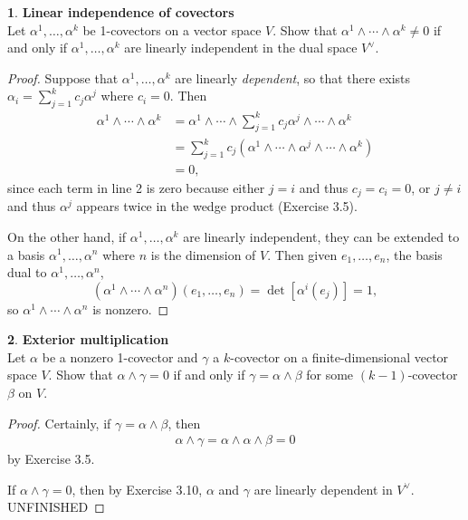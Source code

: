 \documentclass[12pt]{article}
\theoremstyle{definition}
\newtheorem{ex}{}[section]
\begin{document}
\begin{ex}
	\textbf{Linear independence of covectors} \\
	Let $\alpha^1, \dots, \alpha^k$ be 1-covectors on a vector space $V$.
	Show that $\alpha^1 \wedge \cdots \wedge \alpha^k \neq 0$ if and only if $\alpha^1, \dots, \alpha^k$ are linearly independent in the dual space $V^\vee$.
\end{ex}
\begin{proof}
	Suppose that $\alpha^1, \dots, \alpha^k$ are linearly \textit{dependent}, so that there exists $\alpha_i = \sum_{j = 1}^k c_j\alpha^j$ where $c_i = 0$.
	Then \begin{align*}
		\alpha^1 \wedge \cdots \wedge \alpha^k & = \alpha^1 \wedge \cdots \wedge \sum_{j=1}^k c_j\alpha^j \wedge\cdots\wedge \alpha^k    \\
                                           & = \sum_{j=1}^k c_j \left(\alpha^1 \wedge \cdots \wedge \alpha^j \wedge \cdots \wedge \alpha^k\right) \\
                                           & = 0,
	\end{align*}
  since each term in line 2 is zero because either $j = i$ and thus $c_j = c_i = 0$, or $j \neq i$ and thus $\alpha^j$ appears twice in the wedge product (Exercise 3.5).

  On the other hand, if $\alpha^1, \dots, \alpha^k$ are linearly independent, they can be extended to a basis $\alpha^1, \dots, \alpha^n$ where $n$ is the dimension of $V$.
  Then given $e_1, \dots, e_n$, the basis dual to $\alpha^1, \dots, \alpha^n$, \begin{equation*}
    (\alpha^1 \wedge \cdots \wedge \alpha^n)(e_1, \dots, e_n) = \det [\alpha^i(e_j)] = 1,
  \end{equation*}
  so $\alpha^1 \wedge \cdots \wedge \alpha^n$ is nonzero.
\end{proof}

\begin{ex}
  \textbf{Exterior multiplication} \\
  Let $\alpha$ be a nonzero 1-covector and $\gamma$ a $k$-covector on a finite-dimensional vector space $V$.
  Show that $\alpha \wedge \gamma = 0$ if and only if $\gamma = \alpha \wedge \beta$ for some $(k-1)$-covector $\beta$ on $V$.
\end{ex}
\begin{proof}
  Certainly, if $\gamma = \alpha \wedge \beta$, then \begin{align*}
    \alpha \wedge \gamma = \alpha \wedge \alpha \wedge \beta = 0
  \end{align*}
  by Exercise 3.5.

  If $\alpha \wedge \gamma = 0$, then by Exercise 3.10, $\alpha$ and $\gamma$ are linearly dependent in $V^\vee$.
  UNFINISHED
\end{proof}
\end{document}
